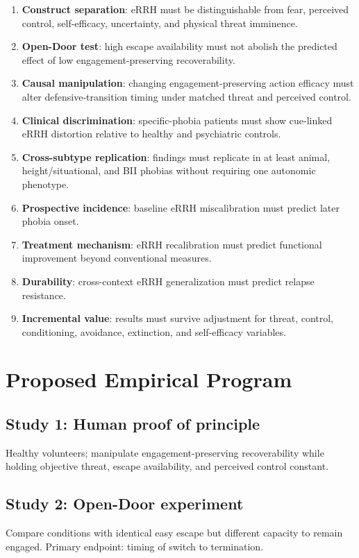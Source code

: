 \documentclass[11pt]{article}
\begin{document}
\begin{enumerate}[leftmargin=*]
\item \textbf{Construct separation}: eRRH must be distinguishable from fear, perceived control, self-efficacy, uncertainty, and physical threat imminence.
\item \textbf{Open-Door test}: high escape availability must not abolish the predicted effect of low engagement-preserving recoverability.
\item \textbf{Causal manipulation}: changing engagement-preserving action efficacy must alter defensive-transition timing under matched threat and perceived control.
\item \textbf{Clinical discrimination}: specific-phobia patients must show cue-linked eRRH distortion relative to healthy and psychiatric controls.
\item \textbf{Cross-subtype replication}: findings must replicate in at least animal, height/situational, and BII phobias without requiring one autonomic phenotype.
\item \textbf{Prospective incidence}: baseline eRRH miscalibration must predict later phobia onset.
\item \textbf{Treatment mechanism}: eRRH recalibration must predict functional improvement beyond conventional measures.
\item \textbf{Durability}: cross-context eRRH generalization must predict relapse resistance.
\item \textbf{Incremental value}: results must survive adjustment for threat, control, conditioning, avoidance, extinction, and self-efficacy variables.
\end{enumerate}

\section{Proposed Empirical Program}

\subsection*{Study 1: Human proof of principle}
Healthy volunteers; manipulate engagement-preserving recoverability while holding objective threat, escape availability, and perceived control constant.

\subsection*{Study 2: Open-Door experiment}
Compare conditions with identical easy escape but different capacity to remain engaged. Primary endpoint: timing of switch to termination.
\end{document}
